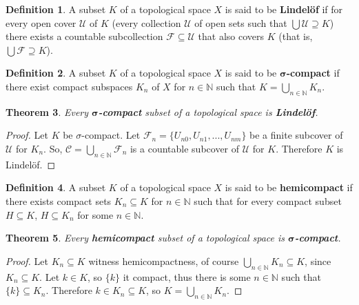 \documentclass{amsart}
\theoremstyle{plain}
\newtheorem{theorem}{Theorem}
\theoremstyle{definition}
\newtheorem{definition}[theorem]{Definition}
\theoremstyle{remark}
\begin{document}
	\begin{definition}
	  A subset \(K\) of a topological space \(X\) is said to be \textbf{Lindel\"of} if for every
	  open cover \(\mathcal U\) of \(K\) (every collection \(\mathcal U\) of open sets
	  such that \(\bigcup \mathcal U\supseteq K\)) there exists a countable subcollection
	  \(\mathcal F\subseteq \mathcal U\) that also covers \(K\) (that is,
	  \(\bigcup\mathcal F\supseteq K\)).
	\end{definition}

	\begin{definition}
	  A subset \(K\) of a topological space \(X\) is said to be \textbf{\(\boldsymbol{\sigma}\)-compact} if
	  there exist compact subspaces \(K_n\) of \(X\) for \(n\in\mathbb N\) such that
	  \(K=\bigcup_{n\in\mathbb N} K_n\).
	  \newline \newline
	\end{definition}
	\begin{theorem}
		Every \(\boldsymbol{\sigma}\)\textbf{-compact} subset of a topological space is \textbf{Lindel\"of}.
	\end{theorem}
	\begin{proof}
	Let $K$ be \(\sigma\)-compact. Let $\mathcal{F}_n = \lbrace U_{n0}, U_{n1}, ..., U_{nm} \rbrace$ be a finite subcover of $\mathcal{U}$ for $K_n$. So, $\mathcal{C} = \bigcup_{n \in \mathbb{N}} \mathcal{F}_n$ is a countable subcover of $\mathcal{U}$ for $K$. Therefore $K$ is Lindel\"of.
	
	\end{proof}


	\begin{definition}
	  A subset \(K\) of a topological space \(X\) is said to be \textbf{hemicompact} if there exists compact sets $K_n \subseteq K$ for $n \in \mathbb{N}$ such that for every compact subset \(H\subseteq K\), \(H\subseteq K_n\) for some \(n\in\mathbb N\).
	\end{definition}

	\begin{theorem}
		Every \textbf{hemicompact} subset of a topological space is \(\boldsymbol{\sigma}\)\textbf{-compact}.
	\end{theorem}
	\begin{proof}
		Let $K_n \subseteq K$ witness hemicompactness, of course $\underset{n \in \mathbb{N}}{\bigcup}K_n \subseteq K$, since $K_n \subseteq K$. Let $k \in K$, so $\lbrace k \rbrace$ it compact, thus there is some $n \in \mathbb{N}$ such that $\lbrace k \rbrace \subseteq K_n$. Therefore $k \in K_n \subseteq K$, so $K = \underset{n \in \mathbb{N}}{\bigcup}K_n$.
	\end{proof}
\end{document}
